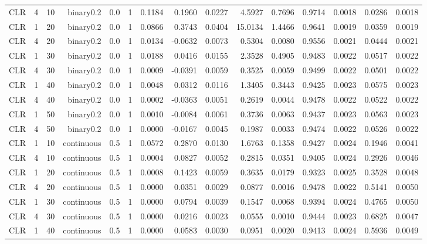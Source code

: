 \begin{longtable}{rrrrrrrrrrrrrrr}
  CLR & 4 & 10 & binary0.2 & 0.0 & 1 & 0.1184 & 0.1960 & 0.0227 & 4.5927 & 0.7696 & 0.9714 & 0.0018 & 0.0286 & 0.0018 \\ 
  CLR & 1 & 20 & binary0.2 & 0.0 & 1 & 0.0866 & 0.3743 & 0.0404 & 15.0134 & 1.4466 & 0.9641 & 0.0019 & 0.0359 & 0.0019 \\ 
  CLR & 4 & 20 & binary0.2 & 0.0 & 1 & 0.0134 & -0.0632 & 0.0073 & 0.5304 & 0.0080 & 0.9556 & 0.0021 & 0.0444 & 0.0021 \\ 
  CLR & 1 & 30 & binary0.2 & 0.0 & 1 & 0.0188 & 0.0416 & 0.0155 & 2.3528 & 0.4905 & 0.9483 & 0.0022 & 0.0517 & 0.0022 \\ 
  CLR & 4 & 30 & binary0.2 & 0.0 & 1 & 0.0009 & -0.0391 & 0.0059 & 0.3525 & 0.0059 & 0.9499 & 0.0022 & 0.0501 & 0.0022 \\ 
  CLR & 1 & 40 & binary0.2 & 0.0 & 1 & 0.0048 & 0.0312 & 0.0116 & 1.3405 & 0.3443 & 0.9425 & 0.0023 & 0.0575 & 0.0023 \\ 
  CLR & 4 & 40 & binary0.2 & 0.0 & 1 & 0.0002 & -0.0363 & 0.0051 & 0.2619 & 0.0044 & 0.9478 & 0.0022 & 0.0522 & 0.0022 \\ 
  CLR & 1 & 50 & binary0.2 & 0.0 & 1 & 0.0010 & -0.0084 & 0.0061 & 0.3736 & 0.0063 & 0.9437 & 0.0023 & 0.0563 & 0.0023 \\ 
  CLR & 4 & 50 & binary0.2 & 0.0 & 1 & 0.0000 & -0.0167 & 0.0045 & 0.1987 & 0.0033 & 0.9474 & 0.0022 & 0.0526 & 0.0022 \\ 
  CLR & 1 & 10 & continuous & 0.5 & 1 & 0.0572 & 0.2870 & 0.0130 & 1.6763 & 0.1358 & 0.9427 & 0.0024 & 0.1946 & 0.0041 \\ 
  CLR & 4 & 10 & continuous & 0.5 & 1 & 0.0004 & 0.0827 & 0.0052 & 0.2815 & 0.0351 & 0.9405 & 0.0024 & 0.2926 & 0.0046 \\ 
  CLR & 1 & 20 & continuous & 0.5 & 1 & 0.0008 & 0.1423 & 0.0059 & 0.3635 & 0.0179 & 0.9323 & 0.0025 & 0.3528 & 0.0048 \\ 
  CLR & 4 & 20 & continuous & 0.5 & 1 & 0.0000 & 0.0351 & 0.0029 & 0.0877 & 0.0016 & 0.9478 & 0.0022 & 0.5141 & 0.0050 \\ 
  CLR & 1 & 30 & continuous & 0.5 & 1 & 0.0000 & 0.0794 & 0.0039 & 0.1547 & 0.0068 & 0.9394 & 0.0024 & 0.4765 & 0.0050 \\ 
  CLR & 4 & 30 & continuous & 0.5 & 1 & 0.0000 & 0.0216 & 0.0023 & 0.0555 & 0.0010 & 0.9444 & 0.0023 & 0.6825 & 0.0047 \\ 
  CLR & 1 & 40 & continuous & 0.5 & 1 & 0.0000 & 0.0583 & 0.0030 & 0.0951 & 0.0020 & 0.9413 & 0.0024 & 0.5936 & 0.0049 \\ 

\end{longtable}
